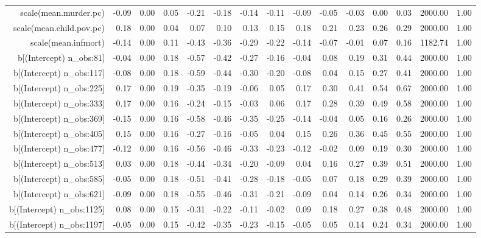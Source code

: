 \begin{table}[ht]
\begin{tabular}{rrrrrrrrrrrrrrr}
  scale(mean.murder.pc) & -0.09 & 0.00 & 0.05 & -0.21 & -0.18 & -0.14 & -0.11 & -0.09 & -0.05 & -0.03 & 0.00 & 0.03 & 2000.00 & 1.00 \\ 
  scale(mean.child.pov.pc) & 0.18 & 0.00 & 0.04 & 0.07 & 0.10 & 0.13 & 0.15 & 0.18 & 0.21 & 0.23 & 0.26 & 0.29 & 2000.00 & 1.00 \\ 
  scale(mean.infmort) & -0.14 & 0.00 & 0.11 & -0.43 & -0.36 & -0.29 & -0.22 & -0.14 & -0.07 & -0.01 & 0.07 & 0.16 & 1182.74 & 1.00 \\ 
  b[(Intercept) n\_obs:81] & -0.04 & 0.00 & 0.18 & -0.57 & -0.42 & -0.27 & -0.16 & -0.04 & 0.08 & 0.19 & 0.31 & 0.44 & 2000.00 & 1.00 \\ 
  b[(Intercept) n\_obs:117] & -0.08 & 0.00 & 0.18 & -0.59 & -0.44 & -0.30 & -0.20 & -0.08 & 0.04 & 0.15 & 0.27 & 0.41 & 2000.00 & 1.00 \\ 
  b[(Intercept) n\_obs:225] & 0.17 & 0.00 & 0.19 & -0.35 & -0.19 & -0.06 & 0.05 & 0.17 & 0.30 & 0.41 & 0.54 & 0.67 & 2000.00 & 1.00 \\ 
  b[(Intercept) n\_obs:333] & 0.17 & 0.00 & 0.16 & -0.24 & -0.15 & -0.03 & 0.06 & 0.17 & 0.28 & 0.39 & 0.49 & 0.58 & 2000.00 & 1.00 \\ 
  b[(Intercept) n\_obs:369] & -0.15 & 0.00 & 0.16 & -0.58 & -0.46 & -0.35 & -0.25 & -0.14 & -0.04 & 0.05 & 0.16 & 0.26 & 2000.00 & 1.00 \\ 
  b[(Intercept) n\_obs:405] & 0.15 & 0.00 & 0.16 & -0.27 & -0.16 & -0.05 & 0.04 & 0.15 & 0.26 & 0.36 & 0.45 & 0.55 & 2000.00 & 1.00 \\ 
  b[(Intercept) n\_obs:477] & -0.12 & 0.00 & 0.16 & -0.56 & -0.46 & -0.33 & -0.23 & -0.12 & -0.02 & 0.09 & 0.19 & 0.30 & 2000.00 & 1.00 \\ 
  b[(Intercept) n\_obs:513] & 0.03 & 0.00 & 0.18 & -0.44 & -0.34 & -0.20 & -0.09 & 0.04 & 0.16 & 0.27 & 0.39 & 0.51 & 2000.00 & 1.00 \\ 
  b[(Intercept) n\_obs:585] & -0.05 & 0.00 & 0.18 & -0.51 & -0.41 & -0.28 & -0.18 & -0.05 & 0.07 & 0.18 & 0.29 & 0.39 & 2000.00 & 1.00 \\ 
  b[(Intercept) n\_obs:621] & -0.09 & 0.00 & 0.18 & -0.55 & -0.46 & -0.31 & -0.21 & -0.09 & 0.04 & 0.14 & 0.26 & 0.34 & 2000.00 & 1.00 \\ 
  b[(Intercept) n\_obs:1125] & 0.08 & 0.00 & 0.15 & -0.31 & -0.22 & -0.11 & -0.02 & 0.09 & 0.18 & 0.27 & 0.38 & 0.48 & 2000.00 & 1.00 \\ 
  b[(Intercept) n\_obs:1197] & -0.05 & 0.00 & 0.15 & -0.42 & -0.35 & -0.23 & -0.15 & -0.05 & 0.05 & 0.14 & 0.24 & 0.34 & 2000.00 & 1.00 \\ 

\end{tabular}
\end{table}
